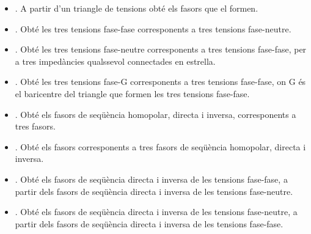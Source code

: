 \begin{itemize}
   \item {}. A partir d'un triangle de tensions obté els fasors que el formen.
   \item {}. Obté les tres tensions fase-fase corresponents a tres tensions fase-neutre.
   \item {}. Obté les tres tensions fase-neutre corresponents a tres tensions fase-fase, per a tres impedàncies qualssevol connectades en estrella.
   \item {}. Obté les tres tensions fase-G corresponents a tres tensions fase-fase, on G és el baricentre del triangle que formen les tres tensions fase-fase.
   \item {}. Obté els fasors de seqüència homopolar, directa i inversa, corresponents a tres fasors.
   \item {}. Obté els  fasors corresponents a tres fasors de seqüència homopolar, directa i inversa.
   \item {}. Obté els fasors de seqüència directa i inversa de les tensions fase-fase, a partir dels fasors de seqüència directa i inversa de les tensions fase-neutre.
   \item {}. Obté els fasors de seqüència directa i inversa de les tensions fase-neutre, a partir dels fasors de seqüència directa i inversa de les tensions fase-fase.
\end{itemize}

